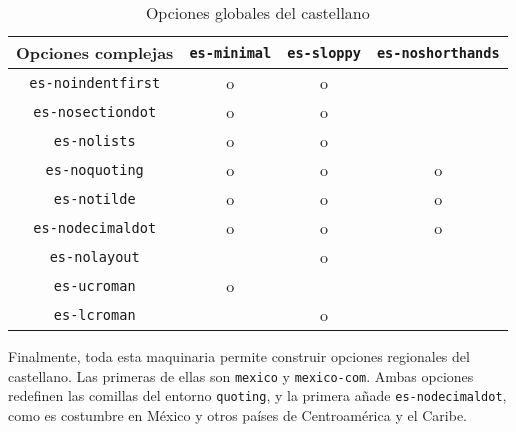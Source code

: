  \begin{table}
 \centering
 \begin{tabular}{cccc}\hline
  Opciones complejas & \verb|es-minimal| & \verb|es-sloppy| & \verb|es-noshorthands| \\\hline
  \verb|es-noindentfirst|  & o  & o  &   \\
  \verb|es-nosectiondot|   & o  & o  &   \\
  \verb|es-nolists|        & o  & o  &   \\
  \verb|es-noquoting|      & o  & o  & o \\
  \verb|es-notilde|        & o  & o  & o \\
  \verb|es-nodecimaldot|   & o  & o  & o \\
  \verb|es-nolayout|       &    & o  &   \\
  \verb|es-ucroman|        & o  &    &   \\
  \verb|es-lcroman|        &    & o  &   \\\hline
 \end{tabular}
  \caption{Opciones globales del castellano}
  \label{tab:SpanishCustomizationOptions}
 \end{table}

Finalmente, toda esta maquinaria permite construir opciones regionales del castellano. Las primeras de ellas son \verb|mexico| y \verb|mexico-com|. Ambas opciones redefinen las comillas del entorno \verb|quoting|, y la primera añade \verb|es-nodecimaldot|, como es costumbre en México y otros países de Centroamérica y el Caribe.

